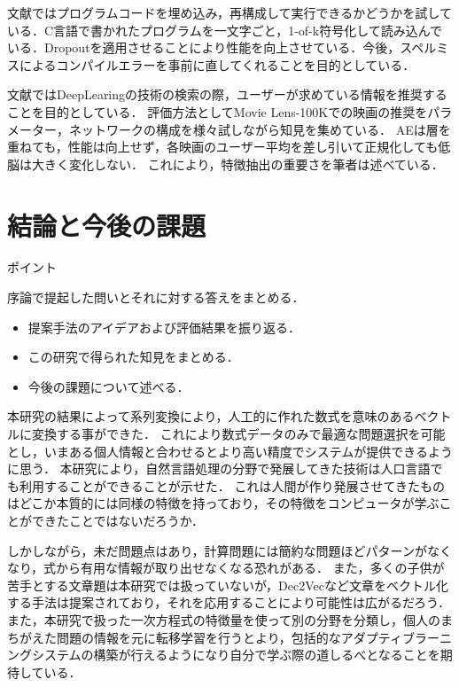 \documentclass[a4j,11pt,report]{jsbook}
\newcommand{\point}[1]{
\begin{itembox}[l]{ポイント}
  #1
\end{itembox}
}
\begin{document}
文献\cite{lannrenn4}ではプログラムコードを埋め込み，再構成して実行できるかどうかを試している．C言語で書かれたプログラムを一文字ごと，1-of-k符号化して読み込んでいる．Dropoutを適用させることにより性能を向上させている．今後，スペルミスによるコンパイルエラーを事前に直してくれることを目的としている．

文献\cite{kannrenn5}ではDeepLearingの技術の検索の際，ユーザーが求めている情報を推奨することを目的としている．
評価方法としてMovie Lens-100Kでの映画の推奨をパラメーター，ネットワークの構成を様々試しながら知見を集めている．
AEは層を重ねても，性能は向上せず，各映画のユーザー平均を差し引いて正規化しても低脳は大きく変化しない．
これにより，特徴抽出の重要さを筆者は述べている．





\chapter{結論と今後の課題 \label{ch:conclusion}}
\point{
序論で提起した問いとそれに対する答えをまとめる．
\begin{itemize}
  \item 提案手法のアイデアおよび評価結果を振り返る．
  \item この研究で得られた知見をまとめる．
  \item 今後の課題について述べる．
\end{itemize}
}
\fi

本研究の結果によって系列変換により，人工的に作れた数式を意味のあるベクトルに変換する事ができた．
これにより数式データのみで最適な問題選択を可能とし，いまある個人情報と合わせるとより高い精度でシステムが提供できるように思う．
本研究により，自然言語処理の分野で発展してきた技術は人口言語でも利用することができることが示せた．
これは人間が作り発展させてきたものはどこか本質的には同様の特徴を持っており，その特徴をコンピュータが学ぶことができたことではないだろうか．

しかしながら，未だ問題点はあり，計算問題には簡約な問題ほどパターンがなくなり，式から有用な情報が取り出せなくなる恐れがある．
また，多くの子供が苦手とする文章題は本研究では扱っていないが，Dec2Vecなど文章をベクトル化する手法は提案されており，それを応用することにより可能性は広がるだろう．
また，本研究で扱った一次方程式の特徴量を使って別の分野を分類し，個人のまちがえた問題の情報を元に転移学習を行うとより，包括的なアダプティブラーニングシステムの構築が行えるようになり自分で学ぶ際の道しるべとなることを期待している．
\end{document}

